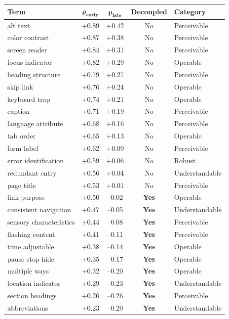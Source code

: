 \documentclass[10pt]{article} %
\begin{document}
\begin{table}[H]
\centering
\scriptsize
\begin{tabular}{|l|c|c|c|l|}
\hline
\textbf{Term} & $\mathbf{\rho_\text{early}}$ & $\mathbf{\rho_\text{late}}$ & \textbf{Decoupled} & \textbf{Category} \\
\hline
alt text & +0.89 & +0.42 & No & Perceivable \\
color contrast & +0.87 & +0.38 & No & Perceivable \\
screen reader & +0.84 & +0.31 & No & Perceivable \\
focus indicator & +0.82 & +0.29 & No & Operable \\
heading structure & +0.79 & +0.27 & No & Perceivable \\
skip link & +0.76 & +0.24 & No & Operable \\
keyboard trap & +0.74 & +0.21 & No & Operable \\
caption & +0.71 & +0.19 & No & Perceivable \\
language attribute & +0.68 & +0.16 & No & Perceivable \\
tab order & +0.65 & +0.13 & No & Operable \\
form label & +0.62 & +0.09 & No & Perceivable \\
error identification & +0.59 & +0.06 & No & Robust \\
redundant entry & +0.56 & +0.04 & No & Understandable \\
page title & +0.53 & +0.01 & No & Perceivable \\
link purpose & +0.50 & --0.02 & \textbf{Yes} & Operable \\
consistent navigation & +0.47 & --0.05 & \textbf{Yes} & Understandable \\
sensory characteristics & +0.44 & --0.08 & \textbf{Yes} & Perceivable \\
flashing content & +0.41 & --0.11 & \textbf{Yes} & Perceivable \\
time adjustable & +0.38 & --0.14 & \textbf{Yes} & Operable \\
pause stop hide & +0.35 & --0.17 & \textbf{Yes} & Operable \\
multiple ways & +0.32 & --0.20 & \textbf{Yes} & Operable \\
location indicator & +0.29 & --0.23 & \textbf{Yes} & Understandable \\
section headings & +0.26 & --0.26 & \textbf{Yes} & Perceivable \\
abbreviations & +0.23 & --0.29 & \textbf{Yes} & Understandable \\

\end{tabular}
\end{table}
\end{document}
